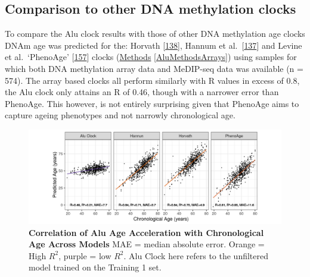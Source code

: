 \documentclass[
]{book}
\begin{document}
\hypertarget{comparison-to-other-dna-methylation-clocks}{%
\subsection{Comparison to other DNA methylation clocks}\label{comparison-to-other-dna-methylation-clocks}}

To compare the Alu clock results with those of other DNA methylation age clocks DNAm age was predicted for the: Horvath {[}\protect\hyperlink{ref-Horvath2013}{138}{]}, Hannum et al.~{[}\protect\hyperlink{ref-Hannum2013}{137}{]} and Levine et al.~`PhenoAge' {[}\protect\hyperlink{ref-Levine2018}{157}{]} clocks (\protect\hyperlink{AluMethodsArrays}{Methods} \ref{AluMethodsArrays}) using samples for which both DNA methylation array data and MeDIP-seq data was available (n = 574).
The array based clocks all perform similarly with R values in excess of 0.8, the Alu clock only attains an R of 0.46, though with a narrower error than PhenoAge.
This however, is not entirely surprising given that PhenoAge aims to capture ageing phenotypes and not narrowly chronological age.

\begin{figure}

{\centering \includegraphics[width=0.9\linewidth]{./figs/age_vs_pred_age} 

}

\caption{\textbf{Correlation of Alu Age Acceleration with Chronological Age Across Models} MAE = median absolute error. Orange = High \(R^2\), purple = low \(R^2\). Alu Clock here refers to the unfiltered model trained on the Training 1 set.}\label{fig:ageVsPredage}
\end{figure}
\end{document}
